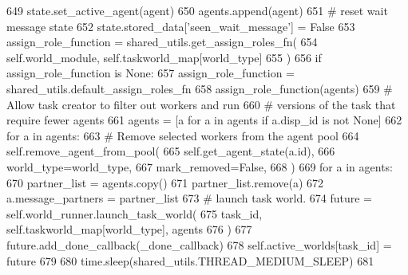 \begin{DoxyCode}
649                             state.set\_active\_agent(agent)
650                             agents.append(agent)
651                             \textcolor{comment}{# reset wait message state}
652                             state.stored\_data[\textcolor{stringliteral}{'seen\_wait\_message'}] = \textcolor{keyword}{False}
653                         assign\_role\_function = shared\_utils.get\_assign\_roles\_fn(
654                             self.world\_module, self.taskworld\_map[world\_type]
655                         )
656                         \textcolor{keywordflow}{if} assign\_role\_function \textcolor{keywordflow}{is} \textcolor{keywordtype}{None}:
657                             assign\_role\_function = shared\_utils.default\_assign\_roles\_fn
658                         assign\_role\_function(agents)
659                         \textcolor{comment}{# Allow task creator to filter out workers and run}
660                         \textcolor{comment}{# versions of the task that require fewer agents}
661                         agents = [a \textcolor{keywordflow}{for} a \textcolor{keywordflow}{in} agents \textcolor{keywordflow}{if} a.disp\_id \textcolor{keywordflow}{is} \textcolor{keywordflow}{not} \textcolor{keywordtype}{None}]
662                         \textcolor{keywordflow}{for} a \textcolor{keywordflow}{in} agents:
663                             \textcolor{comment}{# Remove selected workers from the agent pool}
664                             self.remove\_agent\_from\_pool(
665                                 self.get\_agent\_state(a.id),
666                                 world\_type=world\_type,
667                                 mark\_removed=\textcolor{keyword}{False},
668                             )
669                         \textcolor{keywordflow}{for} a \textcolor{keywordflow}{in} agents:
670                             partner\_list = agents.copy()
671                             partner\_list.remove(a)
672                             a.message\_partners = partner\_list
673                         \textcolor{comment}{# launch task world.}
674                         future = self.world\_runner.launch\_task\_world(
675                             task\_id, self.taskworld\_map[world\_type], agents
676                         )
677                         future.add\_done\_callback(\_done\_callback)
678                         self.active\_worlds[task\_id] = future
679 
680             time.sleep(shared\_utils.THREAD\_MEDIUM\_SLEEP)
681 
\end{DoxyCode}
\mbox{\label{classparlai_1_1chat__service_1_1core_1_1chat__service__manager_1_1ChatServiceManager_a7e2ef8f0e63e1078cbffccbcaa6719b0}} 
